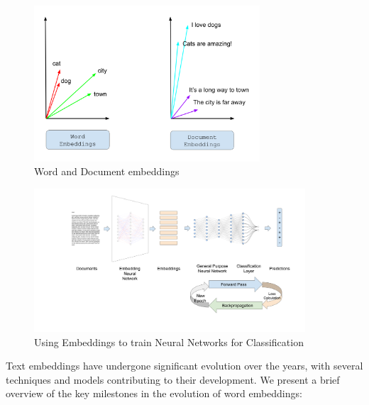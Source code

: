\begin{figure}
    \centering
    \includegraphics[width=0.75\textwidth]{Figures/02/02_embeddings.png}
    \caption{Word and Document embeddings}
    \label{fig:word_and_document_embeddings}
\end{figure}

\begin{figure}
    \centering
    \includegraphics[width=0.9\textwidth]{Figures/02/02_nns_for_nlp.png}
    \caption{Using Embeddings to train Neural Networks for Classification}
    \label{fig:02_embeddings_for_training_classification}
\end{figure}

Text embeddings have undergone significant evolution over the years, with several techniques and models contributing to their development. We present a brief overview of the key milestones in the evolution of word embeddings:


